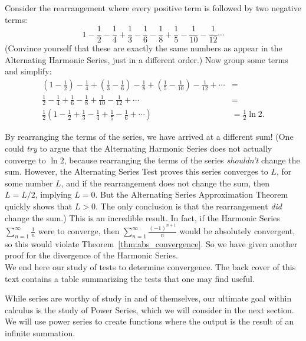Consider the rearrangement where every positive term is followed by two negative terms:
$$
1-\frac12-\frac14+\frac13-\frac16-\frac18+\frac15-\frac1{10}-\frac1{12}\cdots
$$
(Convince yourself that these are exactly the same numbers as appear in the Alternating Harmonic Series, just in a different order.) Now group some terms and simplify:
\begin{align*}
\left(1-\frac12\right)-\frac14+\left(\frac13-\frac16\right)-\frac18+\left(\frac15-\frac1{10}\right)-\frac1{12}+\cdots &= \\
\frac12-\frac14+\frac16-\frac18+\frac1{10}-\frac{1}{12}+\cdots &= \\
\frac12\left(1-\frac12+\frac13-\frac14+\frac15-\frac16+\cdots\right) & = \frac12\ln 2.
\end{align*}

By rearranging the terms of the series, we have arrived at a different sum! (One could \textit{try} to argue that the Alternating Harmonic Series does not actually converge to $\ln 2$, because rearranging the terms of the series \emph{shouldn't} change the sum. However, the Alternating Series Test proves this series converges to $L$, for some number $L$, and if the rearrangement does not change the sum, then $L = L/2$, implying $L=0$. But the Alternating Series Approximation Theorem quickly shows that $L>0$. The only conclusion is that the rearrangement \emph{did} change the sum.) This is an incredible result.  In fact, if the Harmonic Series $\sum_{n=1}^\infty \frac{1}{n}$ were to converge, then  $\sum_{n=1}^\infty \frac{(-1)^{n+1}}{n}$ would be absolutely convergent, so this would violate Theorem~\ref{thm:abs_convergence}.  So we have given another proof for the divergence of the Harmonic Series.\\

We end here our study of tests to determine convergence. The back cover of this text contains a table summarizing the tests that one may find useful. 

While series are worthy of study in and of themselves, our ultimate goal within calculus is the study of Power Series, which we will consider in the next section. We will use power series to create functions where the output is the result of an infinite summation. %

